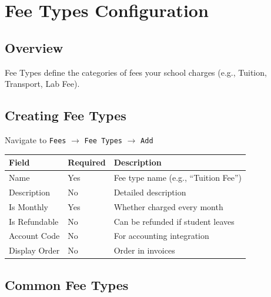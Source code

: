 \documentclass[12pt,a4paper]{report}
\begin{document}
\chapter{Fee Types Configuration}

\section{Overview}

Fee Types define the categories of fees your school charges (e.g., Tuition, Transport, Lab Fee).

\section{Creating Fee Types}

Navigate to \texttt{Fees} $\rightarrow$ \texttt{Fee Types} $\rightarrow$ \texttt{Add}

\begin{longtable}{@{}p{4cm}p{3cm}p{6cm}@{}}
\toprule
\textbf{Field} & \textbf{Required} & \textbf{Description} \\
\midrule
\endhead
Name & Yes & Fee type name (e.g., ``Tuition Fee'') \\
Description & No & Detailed description \\
Is Monthly & Yes & Whether charged every month \\
Is Refundable & No & Can be refunded if student leaves \\
Account Code & No & For accounting integration \\
Display Order & No & Order in invoices \\
\bottomrule
\end{longtable}

\section{Common Fee Types}

\begin{center}
\end{center}
\end{document}

